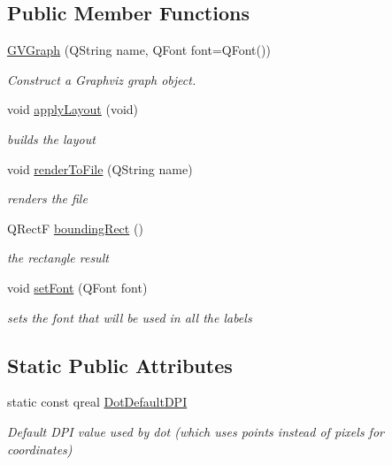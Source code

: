 \subsection*{\-Public \-Member \-Functions}
\begin{DoxyCompactItemize}
\item 
\hyperlink{class_g_v_graph_af47604f64a70e17ba11af26787497fbb}{\-G\-V\-Graph} (\-Q\-String name, \-Q\-Font font=\-Q\-Font())
\begin{DoxyCompactList}\small\item\em \-Construct a \-Graphviz graph object. \end{DoxyCompactList}\item 
\hypertarget{class_g_v_graph_aebfd43267ab4f7cfb46d2841f6b52aeb}{void \hyperlink{class_g_v_graph_aebfd43267ab4f7cfb46d2841f6b52aeb}{apply\-Layout} (void)}\label{class_g_v_graph_aebfd43267ab4f7cfb46d2841f6b52aeb}

\begin{DoxyCompactList}\small\item\em builds the layout \end{DoxyCompactList}\item 
void \hyperlink{class_g_v_graph_a9fee4d22192b53b8b012ed3e72ea92cd}{render\-To\-File} (\-Q\-String name)
\begin{DoxyCompactList}\small\item\em renders the file \end{DoxyCompactList}\item 
\-Q\-Rect\-F \hyperlink{class_g_v_graph_a381255296a418044949c6854699a1f76}{bounding\-Rect} ()
\begin{DoxyCompactList}\small\item\em the rectangle result \end{DoxyCompactList}\item 
void \hyperlink{class_g_v_graph_ae48ac71c72224ac6e6c761fd6e9b3c61}{set\-Font} (\-Q\-Font font)
\begin{DoxyCompactList}\small\item\em sets the font that will be used in all the labels \end{DoxyCompactList}\end{DoxyCompactItemize}
\subsection*{\-Static \-Public \-Attributes}
\begin{DoxyCompactItemize}
\item 
\hypertarget{class_g_v_graph_a643ff39dc5b5aba36f91f0d4d55cdc70}{static const qreal \hyperlink{class_g_v_graph_a643ff39dc5b5aba36f91f0d4d55cdc70}{\-Dot\-Default\-D\-P\-I}}\label{class_g_v_graph_a643ff39dc5b5aba36f91f0d4d55cdc70}

\begin{DoxyCompactList}\small\item\em \-Default \-D\-P\-I value used by dot (which uses points instead of pixels for coordinates) \end{DoxyCompactList}\end{DoxyCompactItemize}



